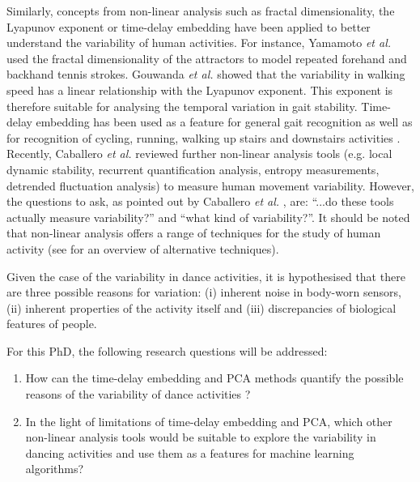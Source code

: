 \documentclass[10pt,journal,compsoc]{IEEEtran}
\begin{document}
Similarly, concepts from non-linear analysis such as fractal dimensionality, 
the Lyapunov exponent or time-delay embedding have been applied to better 
understand the variability of human activities.
For instance, Yamamoto \emph{et al.} \cite{Suzuki2013, Yamamoto2000} used the fractal dimensionality 
of the attractors to model repeated forehand and backhand tennis strokes.
Gouwanda \emph{et al.} \cite{Gouwanda2012} showed that the variability in walking speed 
has a linear relationship with the Lyapunov exponent. 
This exponent is therefore suitable 
for analysing the temporal variation in gait stability.
Time-delay embedding has been used as a feature 
for general gait recognition \cite{Sama2013} as well as for recognition 
of cycling, running, walking up stairs and downstairs activities \cite{Frank2010}.
Recently,  Caballero \emph{et al.} \cite{Caballero2014} reviewed 
further non-linear analysis tools
(e.g. local dynamic stability, recurrent quantification analysis, entropy measurements,
detrended fluctuation analysis) to measure human movement variability. 
However, the questions to ask, as pointed out by Caballero \emph{et al.} \cite{Caballero2014}, 
are: ``...do these tools actually measure variability?'' and ``what kind of variability?''.
It should be noted that non-linear analysis offers a range of techniques for the study of 
human activity (see \cite{Guastello2011} for an overview of alternative techniques). 

Given the case of the variability in dance activities, it is hypothesised that 
there are three possible reasons for variation:
(i) inherent noise in body-worn sensors, 
(ii) inherent properties of the activity itself and
(iii) discrepancies of biological features of people.

For this PhD, the following research questions will be addressed:
\begin{enumerate}
 \item How can the time-delay embedding and PCA methods quantify the possible reasons of 
 the variability of dance activities ?
 \item In the light of limitations of time-delay embedding and PCA,
 which other non-linear analysis tools would be suitable to explore 
 the variability in dancing activities and use them as a features for machine learning algorithms?
\end{enumerate}
\end{document}
